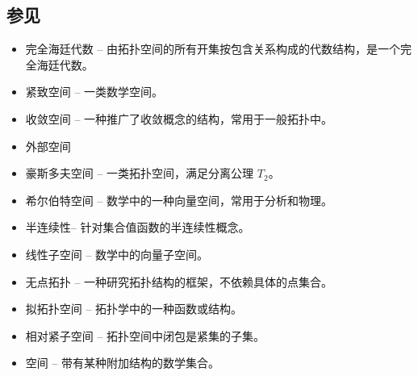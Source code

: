 \subsection{参见}
\begin{itemize}
\item 完全海廷代数 – 由拓扑空间的所有开集按包含关系构成的代数结构，是一个完全海廷代数。
\item 紧致空间 – 一类数学空间。
\item 收敛空间 – 一种推广了收敛概念的结构，常用于一般拓扑中。
\item 外部空间
\item 豪斯多夫空间 – 一类拓扑空间，满足分离公理 $T_2$。
\item 希尔伯特空间 – 数学中的一种向量空间，常用于分析和物理。
\item 半连续性– 针对集合值函数的半连续性概念。
\item 线性子空间 – 数学中的向量子空间。
\item 无点拓扑 – 一种研究拓扑结构的框架，不依赖具体的点集合。
\item 拟拓扑空间 – 拓扑学中的一种函数或结构。
\item 相对紧子空间 – 拓扑空间中闭包是紧集的子集。
\item 空间 – 带有某种附加结构的数学集合。
\end{itemize}
